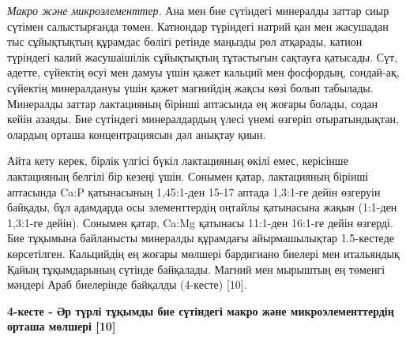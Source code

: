 \emph{Макро және микроэлементтер.} Ана мен бие сүтіндегі минералды
заттар сиыр сүтімен салыстырғанда төмен. Катиондар түріндегі натрий қан
мен жасушадан тыс сұйықтықтың құрамдас бөлігі ретінде маңызды рөл
атқарады, катион түріндегі калий жасушаішілік сұйықтықтың тұтастығын
сақтауға қатысады. Сүт, әдетте, сүйектің өсуі мен дамуы үшін қажет
кальций мен фосфордың, сондай-ақ, сүйектің минералдануы үшін қажет
магнийдің жақсы көзі болып табылады. Минералды заттар лактацияның
бірінші аптасында ең жоғары болады, содан кейін азаяды. Бие сүтіндегі
минералдардың үлесі үнемі өзгеріп отыратындықтан, олардың орташа
концентрациясын дәл анықтау қиын.

Айта кету керек, бірлік үлгісі бүкіл лактацияның өкілі емес, керісінше
лактацияның белгілі бір кезеңі үшін. Сонымен қатар, лактацияның бірінші
аптасында Ca:P қатынасының 1,45:1-ден 15-17 аптада 1,3:1-ге дейін
өзгеруін байқады, бұл адамдарда осы элементтердің оңтайлы қатынасына
жақын (1:1-ден 1,3:1-ге дейін). Сонымен қатар, Ca:Mg қатынасы 11:1-ден
16:1-ге дейін өзгерді. Бие тұқымына байланысты минералды құрамдағы
айырмашылықтар 1.5-кестеде көрсетілген. Кальцийдің ең жоғары мөлшері
бардигиано биелері мен итальяндық Қайың тұқымдарының сүтінде байқалады.
Магний мен мырыштың ең төменгі мәндері Араб биелерінде байқалды
(4-кесте) {[}10{]}.

{\bfseries 4-кесте - Әр түрлі тұқымды бие сүтіндегі макро және
микроэлементтердің орташа мөлшері {[}10{]}}

